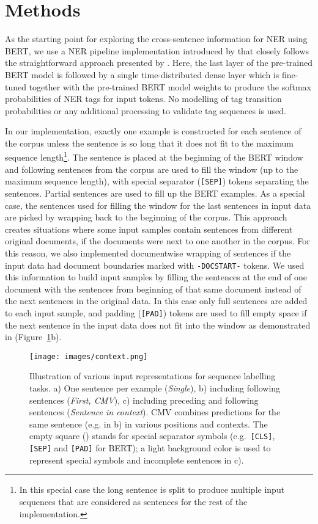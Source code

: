 \documentclass[11pt]{article}
\begin{document}
\section{Methods}
\label{sec:methods}

As the starting point for exploring the cross-sentence information for NER using BERT, we use a NER pipeline implementation introduced by  that closely follows the straightforward approach presented by . Here, the last layer of the pre-trained BERT model is followed by a single time-distributed dense layer which is fine-tuned together with the pre-trained BERT model weights to produce the softmax probabilities of NER tags for input tokens. No modelling of tag transition probabilities or any additional processing to validate tag sequences is used.

In our implementation, exactly one example is constructed for each sentence of the corpus unless the sentence is so long that it does not fit to the maximum sequence length\footnote{In this special case the long sentence is split to produce multiple input sequences that are considered as sentences for the rest of the implementation.}. The sentence is placed at the beginning of the BERT window and following sentences from the corpus are used to fill the window (up to the maximum sequence length), with special separator (\texttt{[SEP]}) tokens separating the sentences. Partial sentences are used to fill up the BERT examples. As a special case, the sentences used for filling the window for the last sentences in input data are picked by wrapping back to the beginning of the corpus. This approach creates situations where some input samples contain sentences from different original documents, if the documents were next to one another in the corpus. For this reason, we also implemented documentwise wrapping of sentences if the input data had document boundaries marked with \texttt{-DOCSTART-} tokens. We used this information to build input samples by filling the sentences at the end of one document with the sentences from beginning of that same document instead of the next sentences in the original data. In this case only full sentences are added to each input sample, and padding (\texttt{[PAD]}) tokens are used to fill empty space if the next sentence in the input data does not fit into the window as demonstrated in (Figure~\ref{fig:context}b).


\begin{figure}[!t]
\texttt{[image: images/context.png]}
\caption{Illustration of various input representations for sequence labelling tasks. a) One sentence per example (\emph{Single}), b) including following sentences (\emph{First, CMV}), c) including preceding and following sentences (\emph{Sentence in context}). CMV combines predictions for the same sentence (e.g.  in b) in various positions and contexts. The empty square ({\small }) stands for special separator symbols (e.g.\ \texttt{[CLS]}, \texttt{[SEP]} and \texttt{[PAD]} for BERT); a light background color is used to represent special symbols and incomplete sentences in c).
}
\label{fig:context}
\end{figure}
\end{document}
